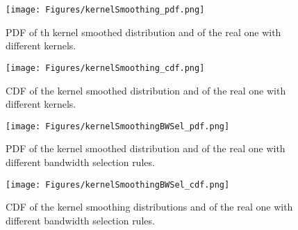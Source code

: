              \begin{figure}[H]
               \begin{minipage}{7cm}
                 \begin{center}
                   \texttt{[image: Figures/kernelSmoothing\_pdf.png]}
                   \caption{PDF of th kernel smoothed distribution and of the real one with different kernels.}
                   \label{pdf_KernelSmooth}
                 \end{center}
               \end{minipage}
               \hfill
               \begin{minipage}{7cm}
                 \begin{center}
                   \texttt{[image: Figures/kernelSmoothing\_cdf.png]}
                   \caption{CDF of the kernel smoothed distribution and of the real one with different kernels.}
                   \label{cdf_KernelSmooth}
                 \end{center}
               \end{minipage}
             \end{figure}


             \begin{figure}[H]
               \begin{minipage}{7cm}
                 \begin{center}
                   \texttt{[image: Figures/kernelSmoothingBWSel\_pdf.png]}
                   \caption{PDF of the kernel smoothed distribution and of the real one with different bandwidth selection rules.}
                   \label{pdf_KernelSmoothBWSel}
                 \end{center}
               \end{minipage}
               \hfill
               \begin{minipage}{7cm}
                 \begin{center}
                   \texttt{[image: Figures/kernelSmoothingBWSel\_cdf.png]}
                   \caption{CDF of the kernel smoothing distributions and of the real one with different bandwidth selection rules.}
                   \label{cdf_KernelSmoothBWSel}
                 \end{center}
               \end{minipage}
             \end{figure}

